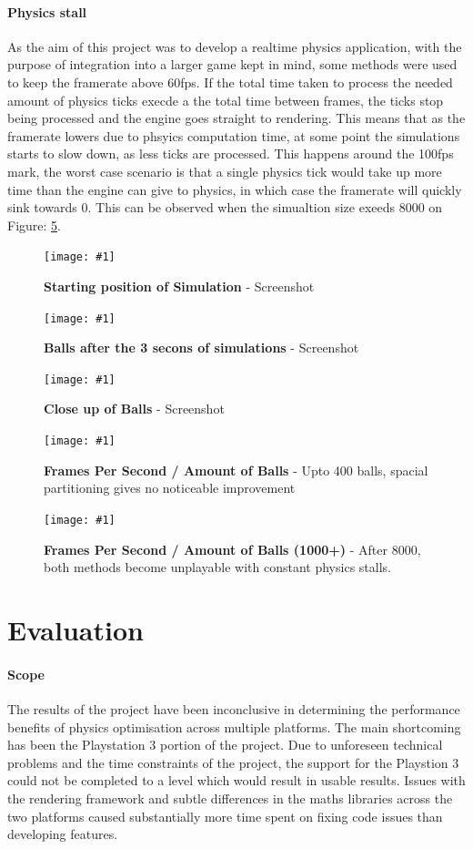 \documentclass[conference]{acmsiggraph}
\newcommand{\figuremacroW}[4]{
	\begin{figure}[h] %
		\centering
		\texttt{[image: \#1]}
		\caption[#2]{\textbf{#2} - #3}
		\label{fig:#1}
	\end{figure}
}
\newcommand{\figuremacroF}[4]{
	\begin{figure}[h] %
		\centering
		\texttt{[image: \#1]}
		\caption[#2]{\textbf{#2} - #3}
		\label{fig:#1}
	\end{figure}
}
\begin{document}
\paragraph{Physics stall}
As the aim of this project was to develop a realtime physics application, with the purpose of integration into a larger game kept in mind, some methods were used to keep the framerate above 60fps. If the total time taken to process the needed amount of physics ticks execde a the total time between frames, the ticks stop being processed and the engine goes straight to rendering. This means that as the framerate lowers due to phsyics computation time, at some point the simulations starts to slow down, as less ticks are processed. This happens around the 100fps mark, the worst case scenario is that a single physics tick would take up more time than the engine can give to physics, in which case the framerate will quickly sink towards 0. This can be observed when the simualtion size exeeds 8000 on Figure: \ref{fig:chart1-b}.


\figuremacroW
{screenshot3}
{Starting position of Simulation}
{Screenshot}
{1.0}

\figuremacroW
{screenshot4}
{Balls after the 3 secons of simulations}
{Screenshot}
{1.0}

\figuremacroW
{screenshot5}
{Close up of Balls}
{Screenshot}
{1.0}


\figuremacroF
{chart1-a}
{Frames Per Second / Amount of Balls}
{Upto 400 balls, spacial partitioning gives no noticeable improvement}
{1.0}

\figuremacroF
{chart1-b}
{Frames Per Second / Amount of Balls (1000+)}
{After 8000, both methods become unplayable with constant physics stalls.}
{1.0}

\section{Evaluation}

\paragraph{Scope}
The results of the project have been inconclusive in determining the performance benefits of physics optimisation across multiple platforms. The main shortcoming has been the Playstation 3 portion of the project. Due to unforeseen technical problems and the time constraints of the project, the support for the Playstion 3 could not be completed to a level which would result in usable results. Issues with the rendering framework and subtle differences in the maths libraries across the two platforms caused substantially more time spent on fixing code issues than developing features.
\end{document}
